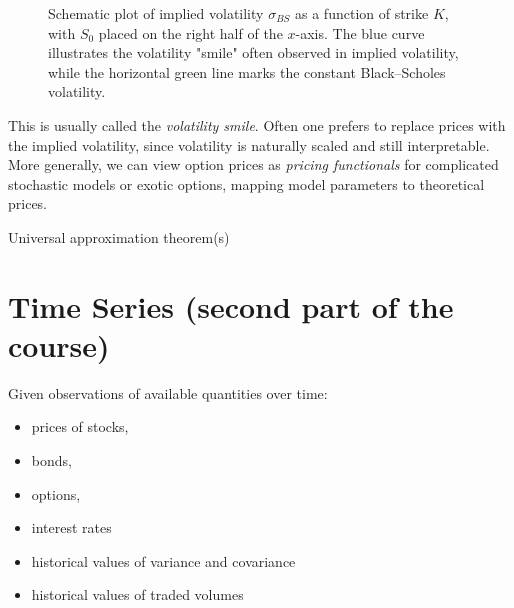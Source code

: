 \documentclass[11pt,a4paper]{article}
\theoremstyle{definition}
\theoremstyle{plain}
\theoremstyle{remark}
\begin{document}
\begin{figure}[h!]
    \centering
    \caption{Schematic plot of implied volatility $\sigma_{BS}$ as a function of strike $K$, with $S_0$ placed on the right half of the $x$-axis. The blue curve illustrates the volatility "smile" often observed in implied volatility, while the horizontal green line marks the constant Black--Scholes volatility.}
    \label{fig:iv_smile}
\end{figure}
This is usually called the \emph{volatility smile}.
Often one prefers to replace prices with the implied volatility, since volatility is naturally scaled and still interpretable. 
More generally, we can view option prices as \emph{pricing functionals} for complicated stochastic models or exotic options,
mapping model parameters to theoretical prices.

Universal approximation theorem(s)

\section{Time Series (second part of the course)}

Given observations of available quantities over time:
\begin{itemize}
    \item prices of stocks, 
    \item bonds, 
    \item options, 
    \item interest rates
    \item historical values of variance and covariance
    \item historical values of traded volumes
\end{itemize}
\end{document}
